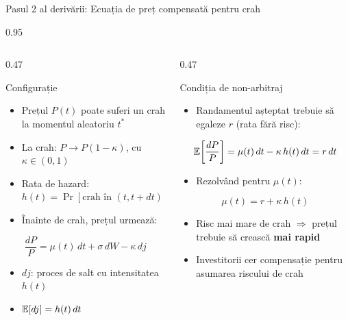 \documentclass[9pt, aspectratio=169, t]{beamer}
\begin{document}
\begin{frame}{Pasul 2 al derivării: Ecuația de preț compensată pentru crah}
    \begin{cminipage}{0.95\textwidth}
    {\footnotesize
    \begin{columns}[T]
        \begin{column}{0.47\textwidth}
            \begin{block}{Configurație}
                \begin{itemize}\setlength{\itemsep}{1pt}
                    \item Prețul $P(t)$ poate suferi un crah la momentul aleatoriu $t^*$
                    \item La crah: $P \to P(1 - \kappa)$, cu $\kappa \in (0,1)$
                    \item Rata de hazard: $h(t) = \Pr[\text{crah în } (t, t+dt)] / dt$
                    \item Înainte de crah, prețul urmează:
                \end{itemize}
                \vspace{1mm}
                $$\frac{dP}{P} = \mu(t)\,dt + \sigma\,dW - \kappa\,dj$$
                \begin{itemize}\setlength{\itemsep}{0pt}
                    \item $dj$: proces de salt cu intensitatea $h(t)$
                    \item $\mathbb{E}[dj] = h(t)\,dt$
                \end{itemize}
            \end{block}
        \end{column}
        \begin{column}{0.47\textwidth}
            \begin{alertblock}{Condiția de non-arbitraj}
                \begin{itemize}\setlength{\itemsep}{1pt}
                    \item Randamentul așteptat trebuie să egaleze $r$ (rata fără risc):
                \end{itemize}
                $$\mathbb{E}\!\left[\frac{dP}{P}\right] = \mu(t)\,dt - \kappa\,h(t)\,dt = r\,dt$$
                \begin{itemize}\setlength{\itemsep}{1pt}
                    \item Rezolvând pentru $\mu(t)$:
                \end{itemize}
                $$\boxed{\mu(t) = r + \kappa\, h(t)}$$
                \begin{itemize}\setlength{\itemsep}{0pt}
                    \item Risc mai mare de crah $\Rightarrow$ prețul trebuie să crească \textbf{mai rapid}
                    \item Investitorii cer compensație pentru asumarea riscului de crah
                \end{itemize}
            \end{alertblock}
        \end{column}
    \end{columns}
    }
    \end{cminipage}
\end{frame}
\end{document}
